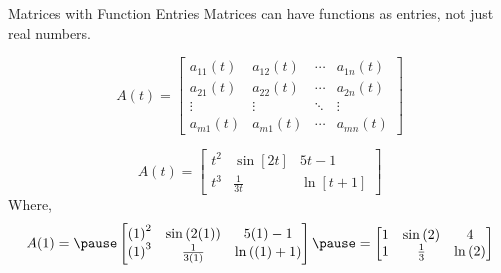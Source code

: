 \documentclass{beamer}
\begin{document}
\begin{frame}
\begin{block}{Matrices with Function Entries}
Matrices can have functions as entries, not just real numbers.

\begin{equation*}
A(t)=\begin{bmatrix}
a_{11}(t)&a_{12}(t)&\cdots&a_{1n}(t)\\
a_{21}(t)&a_{22}(t)&\cdots&a_{2n}(t)\\
\vdots&\vdots&\ddots&\vdots\\
a_{m1}(t)&a_{m1}(t)&\cdots&a_{mn}(t)
\end{bmatrix}
\end{equation*}
\end{block}\pause

\begin{example}
\begin{equation*}
A(t)=
\begin{bmatrix}
t^2 & \sin[2t] & 5t-1 \\
t^3 & \tfrac{1}{3t} & \ln[t+1]
\end{bmatrix}
\end{equation*}
Where,
\begin{equation*}
A(1)=\pause
\begin{bmatrix}
{(1)}^2 & \sin[2(1)] & 5(1)-1 \\
{(1)}^3 & \tfrac{1}{3(1)} & \ln[(1)+1]
\end{bmatrix}\pause
=
\begin{bmatrix}
1 & \sin[2] & 4 \\
1 & \tfrac{1}{3} & \ln[2]
\end{bmatrix}
\end{equation*}
\end{example}
\end{frame}
\end{document}
